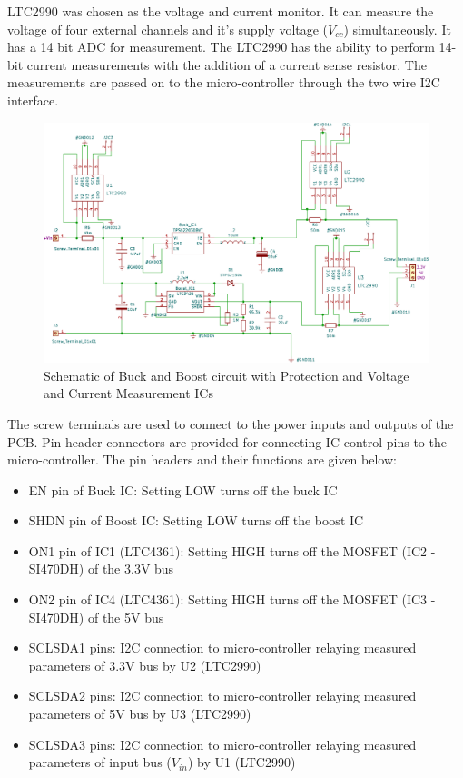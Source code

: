  LTC2990 was chosen as the voltage  and current monitor. It can measure the voltage of four external channels and it's supply voltage ($V_{cc}$) simultaneously. It has a 14 bit ADC for measurement. The LTC2990 has the ability to perform 14-bit current measurements with the addition of a current sense resistor. The measurements are passed on to the micro-controller through the two wire I2C interface.
 \begin{center}
 \begin{figure}[h]
 	\centering
 	\includegraphics[width=\columnwidth]{IMGS/1.pdf}
 	\caption{\centering Schematic of Buck and Boost circuit with Protection and Voltage and Current Measurement ICs}
 	\label{fig:bubo2}
 \end{figure}
\end{center}
The screw terminals are used to connect to the power inputs and outputs of the PCB. Pin header connectors are provided for connecting IC control pins to the micro-controller. The pin headers and their functions are given below:
 \begin{itemize}
 	\item EN pin of Buck IC: Setting LOW turns off the buck IC
 	\item SHDN pin of Boost IC: Setting LOW turns off the boost IC
 	\item ON1 pin of IC1 (LTC4361): Setting HIGH turns off the MOSFET (IC2 - SI470DH) of the 3.3V bus
 	\item ON2 pin of IC4 (LTC4361): Setting HIGH turns off the MOSFET (IC3 - SI470DH) of the 5V bus
 	\item SCLSDA1 pins: I2C connection to micro-controller relaying measured parameters of 3.3V bus by U2 (LTC2990) 
 	\item SCLSDA2 pins: I2C connection to micro-controller relaying measured parameters of 5V bus by U3 (LTC2990) 
 	\item SCLSDA3 pins: I2C connection to micro-controller relaying measured parameters of input bus ($V_{in}$) by U1 (LTC2990)
 \end{itemize}


